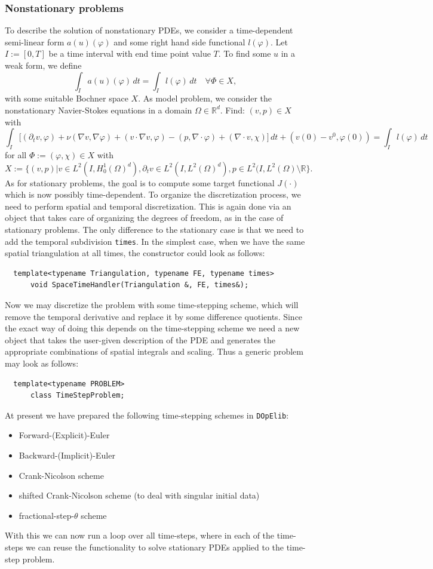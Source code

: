 \documentclass[prodmode,acmtoms]{acmsmall}
\numberwithin{equation}{section}
\renewcommand{\phi}{\varphi}
\newcommand{\dope}{\texttt{DOpElib}}
\begin{document}
\subsubsection{Nonstationary problems}\label{sec:timedep}
To describe the solution of nonstationary 
PDEs, we consider a time-dependent semi-linear form $a(u)(\phi)$ and some
right hand side functional $l(\phi)$.
Let $I:=[0,T]$ be a time interval with end time point value $T$.
To find some $u$ in a weak form, we define
\[
\int_I a(u)(\phi)\, dt = \int_I l(\phi)\, dt \quad \forall\Phi\in X,
\]
with some suitable Bochner space $X$.  As model problem,
we consider the nonstationary Navier-Stokes equations
in a domain $\Omega\in\mathbb{R}^d$. Find: 
$(v,p)\in X$ with
\[
\int_I \bigl[ (\partial_t v, \phi)
+ \nu (\nabla v, \nabla \phi) + (v\cdot\nabla v, \phi)
- (p,\nabla\cdot \phi)
+ (\nabla\cdot v, \chi)\bigr] \, dt
+ (v(0) - v^0, \phi(0))
= \int_I l(\phi) \, dt 
\]
for all $\Phi:= (\phi, \chi) \in X$ with
\[
X:= \bigl\{ 
(v,p) | v\in L^2(I,H_0^1(\Omega)^d) , 
\partial_t v\in L^2(I, L^2(\Omega)^d), 
p\in L^2(I,L^2(\Omega)\setminus\mathbb{R} \bigr\}.
\]
As for stationary problems, the goal is to compute
some target functional $J(\cdot)$ which is now possibly 
time-dependent. To organize the discretization 
process, we need to perform spatial and temporal 
discretization. This is again done via
an object that takes care of organizing the degrees of 
freedom, as in the case of stationary problems.
The only difference to the stationary case is that we need to 
add the temporal subdivision \texttt{times}. In the simplest 
case, when we have the same spatial triangulation 
at all times, the constructor could look as follows:
\begin{lstlisting}
  template<typename Triangulation, typename FE, typename times>
      void SpaceTimeHandler(Triangulation &, FE, times&);
\end{lstlisting}

Now we may discretize the problem with some time-stepping scheme, which will 
remove the temporal derivative and replace it by some difference quotients. 
Since the exact way of doing this depends on the time-stepping scheme 
we need a new object that takes the user-given description of the PDE and 
generates the appropriate combinations of spatial integrals and scaling.
Thus a generic problem may look as follows:
\begin{lstlisting}
  template<typename PROBLEM>
      class TimeStepProblem;
\end{lstlisting}
At present we have prepared the following time-stepping schemes in \dope:
\begin{itemize}
\item Forward-(Explicit)-Euler
\item Backward-(Implicit)-Euler
\item Crank-Nicolson scheme
\item shifted Crank-Nicolson scheme (to deal with singular initial data)
\item fractional-step-$\theta$ scheme
\end{itemize}
With this we can now run a loop over all time-steps, where in each of the 
time-steps we can reuse the functionality to solve stationary PDEs 
applied to the time-step problem. 
\end{document}
